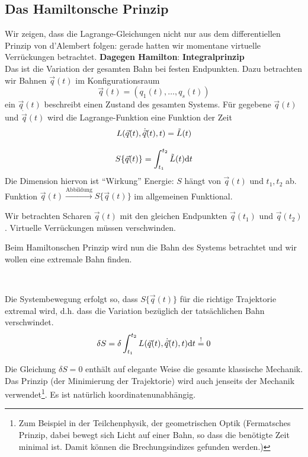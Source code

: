 \subsection{Das Hamiltonsche Prinzip}	
Wir zeigen, dass die Lagrange-Gleichungen nicht nur aus dem differentiellen Prinzip von d'Alembert folgen: gerade hatten wir momentane virtuelle Verrückungen betrachtet.
\textbf{Dagegen Hamilton}: \textbf{Integralprinzip}\\
Das ist die Variation der gesamten Bahn bei festen Endpunkten.
Dazu betrachten wir Bahnen $\vec{q}(t)$ im Konfigurationsraum
$$\vec{q}(t) = (q_1(t), \dots, q_s(t))$$
ein $\vec{q}(t)$ beschreibt einen Zustand des gesamten Systems. Für gegebene $\vec{q}(t)$ und $\dot{\vec{q}}(t)$ wird die Lagrange-Funktion eine Funktion der Zeit 
$$L(\vec{q}(t), \dot{\vec{q}}(t), t) = \tilde{L}(t)$$

\begin{definition*}[Wirkungsfunktional]
$$S\{\vec{q}(t)\} = \int_{t_1}^{t_2} \tilde{L}(t) \mathrm d t$$
Die Dimension hiervon ist "`Wirkung"' \conseq Energie:
$S$ hängt von $\vec{q}(t)$ und $t_1, t_2$ ab. 
Funktion $\vec{q}(t) \xrightarrow{\text{Abbildung}} S \{ \vec{q}(t) \}$ im allgemeinen Funktional.

Wir betrachten Scharen $\vec{q}(t)$ mit den gleichen Endpunkten $\vec{q}(t_1)$ und $\vec{q}(t_2)$. Virtuelle Verrückungen müssen verschwinden.	
\end{definition*}


Beim Hamiltonschen Prinzip wird nun die Bahn des Systems betrachtet und wir wollen eine extremale Bahn finden.

~\\
\begin{definition*}
Die Systembewegung erfolgt so, dass $S\{\vec{q}(t)\}$ für die richtige Trajektorie extremal wird, d.h. dass die Variation bezüglich der tatsächlichen Bahn verschwindet.
$$\delta S = \delta \int_{t_1}^{t_2} L(\vec{q}(t), \dot{\vec{q}}(t), t) \mathrm d t \overset{!}{=} 0$$
\end{definition*}

\begin{bemerkung*}
	Die Gleichung $\delta S = 0$ enthält auf elegante Weise die gesamte klassische Mechanik. Das Prinzip (der Minimierung der Trajektorie) wird auch jenseits der Mechanik verwendet\footnote{Zum Beispiel in der Teilchenphysik, der geometrischen Optik (Fermatsches Prinzip, dabei bewegt sich Licht auf einer Bahn, so dass die benötigte Zeit minimal ist. Damit können die Brechungsindizes gefunden werden.)}. Es ist natürlich koordinatenunabhängig.
\end{bemerkung*}

